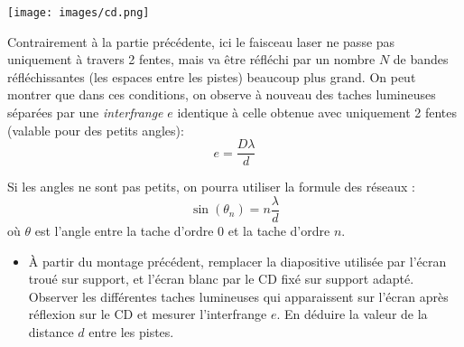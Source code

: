 \documentclass{tp}
\begin{document}
\begin{center}
\end{center}


\begin{center}
  \texttt{[image: images/cd.png]}
\end{center}

Contrairement à la partie précédente, ici le faisceau laser ne passe pas uniquement à travers 2 fentes, mais va être réfléchi par un nombre $N$ de bandes réfléchissantes (les espaces entre les pistes) beaucoup plus grand. On peut montrer que dans ces conditions, on observe à nouveau des taches lumineuses séparées par une \emph{interfrange}  $e$ identique à celle obtenue avec uniquement 2 fentes (valable pour des petits angles):
\begin{equation*}
  e = \frac{D\lambda}{d}
\end{equation*}

Si les angles ne sont pas petits, on pourra utiliser la formule des réseaux :
\[ \sin(\theta_n) = n \frac{\lambda}{d}  \]
où $\theta$ est l'angle entre la tache d'ordre $0$ et la tache d'ordre $n$. 

\begin{itemize}
  \item À partir du montage précédent, remplacer la diapositive utilisée par l’écran troué sur support, et l’écran blanc par le CD fixé sur support adapté. Observer les différentes taches lumineuses qui apparaissent sur l'écran après réflexion sur le CD et mesurer l'interfrange $e$. En déduire la valeur de la distance $d$ entre les pistes.  

\end{itemize}
\end{document}
